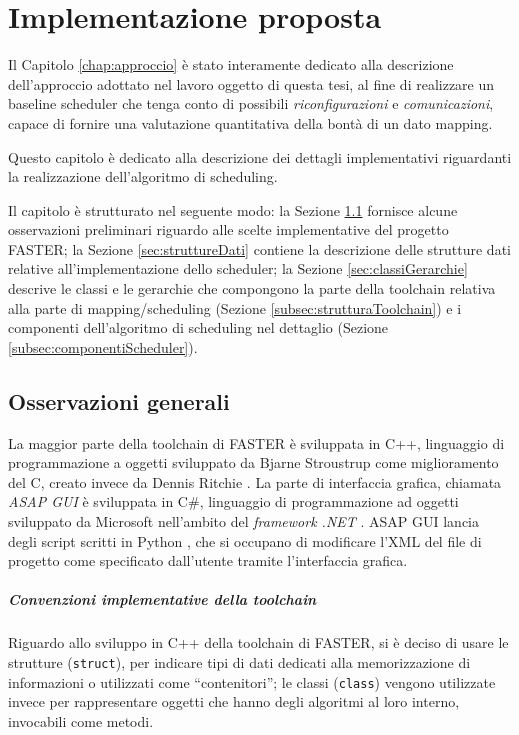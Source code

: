 \chapter{Implementazione proposta}
\label{chap:implementazione}
\vspace{1cm}
Il Capitolo \ref{chap:approccio} è stato interamente dedicato alla descrizione 
dell'approccio adottato nel lavoro oggetto di questa tesi, al fine di 
realizzare un baseline scheduler che tenga conto di possibili 
\emph{riconfigurazioni} e \emph{comunicazioni}, capace di fornire una 
valutazione quantitativa della bontà di un dato mapping.

Questo capitolo è dedicato alla descrizione dei dettagli implementativi 
riguardanti la realizzazione dell'algoritmo di scheduling.

Il capitolo è strutturato nel seguente modo: la Sezione 
\ref{sec:osservazioniGenerali} fornisce alcune osservazioni preliminari 
riguardo alle scelte implementative del progetto \ac{FASTER}; la Sezione 
\ref{sec:struttureDati} contiene la descrizione delle strutture dati relative 
all'implementazione dello scheduler; la Sezione \ref{sec:classiGerarchie} 
descrive le classi e le gerarchie che compongono la parte della toolchain 
relativa alla parte di mapping/scheduling (Sezione 
\ref{subsec:strutturaToolchain}) e i componenti dell'algoritmo di scheduling nel 
dettaglio (Sezione \ref{subsec:componentiScheduler}).


\section{Osservazioni generali}
\label{sec:osservazioniGenerali}
La maggior parte della toolchain di \ac{FASTER} è sviluppata in C++, 
linguaggio di programmazione a oggetti sviluppato da Bjarne Stroustrup 
\cite{CppStroustrup} come miglioramento del C, creato invece da Dennis Ritchie 
\cite{CKernighanRitchie}. La parte di interfaccia grafica, chiamata \emph{ASAP 
GUI} è sviluppata in C\#, linguaggio di programmazione ad oggetti sviluppato da 
Microsoft nell'ambito del \emph{framework .NET} \cite{ProCSharp}. ASAP GUI 
lancia degli script scritti in Python \cite{ThinkPython}, che si occupano di 
modificare l'XML del file di progetto come specificato dall'utente tramite 
l'interfaccia grafica.
\paragraph{Convenzioni implementative della toolchain}
Riguardo allo sviluppo in C++ della toolchain di \ac{FASTER}, si è deciso di 
usare le strutture (\verb+struct+), per indicare tipi di dati dedicati alla 
memorizzazione di informazioni o utilizzati come ``contenitori''; le classi 
(\verb+class+) vengono utilizzate invece per rappresentare oggetti che hanno 
degli algoritmi al loro interno, invocabili come metodi.


